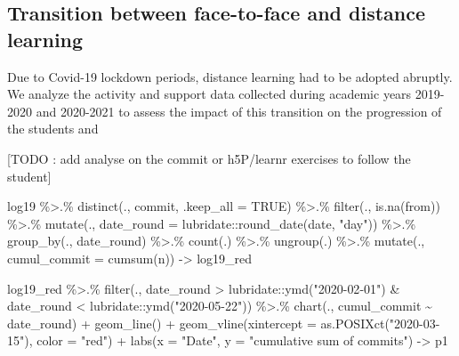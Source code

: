 \documentclass[
]{article}
\newenvironment{Shaded}{\begin{snugshade}}{\end{snugshade}}
\newcommand{\AttributeTok}[1]{\textcolor[rgb]{0.77,0.63,0.00}{#1}}
\newcommand{\ConstantTok}[1]{\textcolor[rgb]{0.00,0.00,0.00}{#1}}
\newcommand{\FunctionTok}[1]{\textcolor[rgb]{0.00,0.00,0.00}{#1}}
\newcommand{\NormalTok}[1]{#1}
\newcommand{\OtherTok}[1]{\textcolor[rgb]{0.56,0.35,0.01}{#1}}
\newcommand{\SpecialCharTok}[1]{\textcolor[rgb]{0.00,0.00,0.00}{#1}}
\newcommand{\StringTok}[1]{\textcolor[rgb]{0.31,0.60,0.02}{#1}}
\begin{document}
\hypertarget{transition-between-face-to-face-and-distance-learning}{%
\subsection{Transition between face-to-face and distance
learning}\label{transition-between-face-to-face-and-distance-learning}}

Due to Covid-19 lockdown periods, distance learning had to be adopted
abruptly. We analyze the activity and support data collected during
academic years 2019-2020 and 2020-2021 to assess the impact of this
transition on the progression of the students and

{[}TODO : add analyse on the commit or h5P/learnr exercises to follow
the student{]}

\begin{Shaded}
\begin{Highlighting}[]
\NormalTok{log19 }\SpecialCharTok{\%\textgreater{}.\%} 
  \FunctionTok{distinct}\NormalTok{(., commit, }\AttributeTok{.keep\_all =} \ConstantTok{TRUE}\NormalTok{) }\SpecialCharTok{\%\textgreater{}.\%}
  \FunctionTok{filter}\NormalTok{(., }\FunctionTok{is.na}\NormalTok{(from)) }\SpecialCharTok{\%\textgreater{}.\%}
  \FunctionTok{mutate}\NormalTok{(., }\AttributeTok{date\_round =}\NormalTok{ lubridate}\SpecialCharTok{::}\FunctionTok{round\_date}\NormalTok{(date, }\StringTok{"day"}\NormalTok{)) }\SpecialCharTok{\%\textgreater{}.\%}
  \FunctionTok{group\_by}\NormalTok{(., date\_round) }\SpecialCharTok{\%\textgreater{}.\%}
  \FunctionTok{count}\NormalTok{(.) }\SpecialCharTok{\%\textgreater{}.\%}
  \FunctionTok{ungroup}\NormalTok{(.) }\SpecialCharTok{\%\textgreater{}.\%}
  \FunctionTok{mutate}\NormalTok{(., }\AttributeTok{cumul\_commit =} \FunctionTok{cumsum}\NormalTok{(n)) }\OtherTok{{-}\textgreater{}}\NormalTok{ log19\_red}


\NormalTok{log19\_red }\SpecialCharTok{\%\textgreater{}.\%}
  \FunctionTok{filter}\NormalTok{(., date\_round }\SpecialCharTok{\textgreater{}}\NormalTok{ lubridate}\SpecialCharTok{::}\FunctionTok{ymd}\NormalTok{(}\StringTok{"2020{-}02{-}01"}\NormalTok{) }\SpecialCharTok{\&}\NormalTok{ date\_round }\SpecialCharTok{\textless{}}\NormalTok{ lubridate}\SpecialCharTok{::}\FunctionTok{ymd}\NormalTok{(}\StringTok{"2020{-}05{-}22"}\NormalTok{)) }\SpecialCharTok{\%\textgreater{}.\%}
  \FunctionTok{chart}\NormalTok{(., cumul\_commit }\SpecialCharTok{\textasciitilde{}}\NormalTok{ date\_round) }\SpecialCharTok{+}
  \FunctionTok{geom\_line}\NormalTok{() }\SpecialCharTok{+}
  \FunctionTok{geom\_vline}\NormalTok{(}\AttributeTok{xintercept =} \FunctionTok{as.POSIXct}\NormalTok{(}\StringTok{"2020{-}03{-}15"}\NormalTok{), }\AttributeTok{color =} \StringTok{"red"}\NormalTok{) }\SpecialCharTok{+}
  \FunctionTok{labs}\NormalTok{(}\AttributeTok{x =} \StringTok{"Date"}\NormalTok{, }\AttributeTok{y =} \StringTok{"cumulative sum of commits"}\NormalTok{) }\OtherTok{{-}\textgreater{}}\NormalTok{ p1}


\end{Highlighting}
\end{Shaded}
\end{document}
